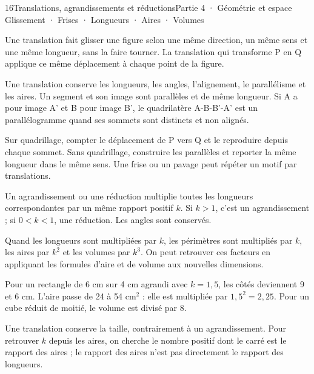 \begin{ouverture}[geometrie]{16}{Translations, agrandissements et réductions}{Partie 4 · Géométrie et espace}
{Glissement · Frises · Longueurs · Aires · Volumes}
\end{ouverture}
\pagestyle{otMain}\essentiel\fontsize{11}{15}\selectfont
{}\label{cours-16-1}
\begin{definition}Une translation fait glisser une figure selon une même direction, un même sens et une même longueur, sans la faire tourner. La translation qui transforme P en Q applique ce même déplacement à chaque point de la figure.\end{definition}
\label{fig-cours-16-1-cours-translation}

\begin{propriete}Une translation conserve les longueurs, les angles, l’alignement, le parallélisme et les aires. Un segment et son image sont parallèles et de même longueur. Si A a pour image A’ et B pour image B’, le quadrilatère A-B-B’-A’ est un parallélogramme quand ses sommets sont distincts et non alignés.\end{propriete}
\begin{savoirfaire}[Construire]Sur quadrillage, compter le déplacement de P vers Q et le reproduire depuis chaque sommet. Sans quadrillage, construire les parallèles et reporter la même longueur dans le même sens. Une frise ou un pavage peut répéter un motif par translations.\end{savoirfaire}
\clearpage
{}\label{cours-16-2}
\begin{definition}Un agrandissement ou une réduction multiplie toutes les longueurs correspondantes par un même rapport positif $k$. Si $k>1$, c’est un agrandissement ; si $0<k<1$, une réduction. Les angles sont conservés.\end{definition}
\begin{propriete}Quand les longueurs sont multipliées par $k$, les périmètres sont multipliés par $k$, les aires par $k^2$ et les volumes par $k^3$. On peut retrouver ces facteurs en appliquant les formules d’aire et de volume aux nouvelles dimensions.\end{propriete}
\begin{exemple}Pour un rectangle de 6 cm sur 4 cm agrandi avec $k=1{,}5$, les côtés deviennent 9 et 6 cm. L’aire passe de 24 à 54 cm$^2$ : elle est multipliée par $1{,}5^2=2{,}25$. Pour un cube réduit de moitié, le volume est divisé par 8.\end{exemple}
\begin{attention}Une translation conserve la taille, contrairement à un agrandissement. Pour retrouver $k$ depuis les aires, on cherche le nombre positif dont le carré est le rapport des aires ; le rapport des aires n’est pas directement le rapport des longueurs.\end{attention}

